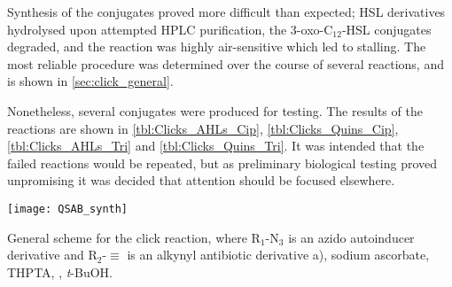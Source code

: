 Synthesis of the conjugates proved more difficult than expected; HSL derivatives hydrolysed upon attempted HPLC purification, the 3-oxo-C$_{12}$-HSL conjugates degraded, and the reaction was highly air-sensitive which led to stalling. The most reliable procedure was determined over the course of several reactions, and is shown in \ref{sec:click_general}.

Nonetheless, several conjugates were produced for testing. The results of the reactions are shown in \ref{tbl:Clicks_AHLs_Cip}, \ref{tbl:Clicks_Quins_Cip}, \ref{tbl:Clicks_AHLs_Tri} and \ref{tbl:Clicks_Quins_Tri}. It was intended that the failed reactions would be repeated, but as preliminary biological testing  proved unpromising it was decided that attention should be focused elsewhere.

\begin{scheme}[H]
	\begin{center}
		\texttt{[image: QSAB\_synth]}
		\caption{General scheme for the click reaction, where R$_1$-N$_3$ is an azido autoinducer derivative and R$_2$-$\equiv$ is an alkynyl antibiotic derivative a), sodium ascorbate, THPTA, , \textit{t}-BuOH.\label{sch:QSAB_synth}} 
	\end{center}
\end{scheme}

